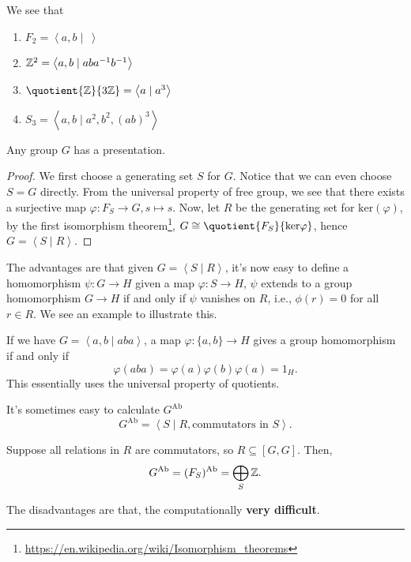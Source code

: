 \begin{eg}
	We see that
	\begin{enumerate}
		\item \(F_2 = \left< a, b \mid\ \right> \)
		\item \(\mathbb{\MakeUppercase{z}} ^2 = \left< a, b \mid aba^{-1} b^{-1}  \right> \)
		\item \(\quotient{\mathbb{\MakeUppercase{z}}}{3\mathbb{\MakeUppercase{z}}} = \left< a \mid a^3 \right> \)
		\item \(S_3 = \left< a, b \mid a^2, b^2, (ab)^3 \right> \)
	\end{enumerate}
\end{eg}

\begin{theorem}
	Any group \(G\) has a presentation.
\end{theorem}
\begin{proof}
	We first choose a generating set \(S\) for \(G\). Notice that we can even choose \(S = G\) directly. From the universal property of free group,
	we see that there exists a surjective map \(\varphi \colon F_S \to G, s \mapsto s\). Now, let \(R\) be the generating set for \(\mathrm{ker}(\varphi) \),
	by the first isomorphism theorem\footnote{\url{https://en.wikipedia.org/wiki/Isomorphism_theorems}}, \(G\cong \quotient{F_S}{\mathrm{ker} \varphi}\), hence \(G = \left< S \mid R \right> \).
\end{proof}

\hr
\begin{remark}
	The advantages are that given \(G = \left< S \mid R \right> \), it's now easy to define a homomorphism \(\psi \colon G\to H\) given a map
	\(\varphi \colon S\to H\), \(\psi \) extends to a group homomorphism \(G\to H\) if and only if \(\psi \) vanishes on \(R\), i.e., \(\phi (r) = 0\)
	for all \(r\in R\). We see an example to illustrate this.

	\begin{eg}
		If we have \(G = \left< a, b \mid aba \right> \), a map \(\varphi \colon \{a, b\}\to H\) gives a group homomorphism if and only if
		\[
			\varphi (aba) = \varphi (a)\varphi (b)\varphi (a) = 1_H.
		\]
		This essentially uses the universal property of quotients.
	\end{eg}
\end{remark}

\hr

\begin{remark}
	It's sometimes easy to calculate \(G^{\mathrm{Ab}}\)
	\[
		G^{\mathrm{Ab}} = \left< S \mid R, \text{commutators in \(S\)}\right>.
	\]
	\begin{eg}
		Suppose all relations in \(R\) are commutators, so \(R\subseteq[G, G]\). Then,
		\[
			G^{\mathrm{Ab}} = (F_S)^{\mathrm{Ab}} = \bigoplus_S \mathbb{\MakeUppercase{z}}.
		\]
	\end{eg}
\end{remark}
\begin{remark}
	The disadvantages are that, the computationally \textbf{very difficult}.
\end{remark}
\hr

